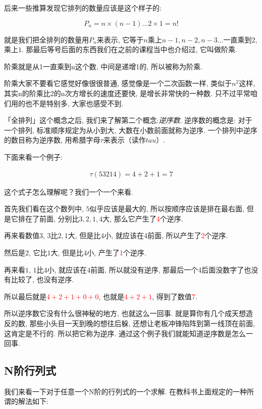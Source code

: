 后来一些推算发现它排列的数量应该是这个样子的: 

\[
  P_n = n \times (n-1) ... 2 \times 1 = n!
\]

就是我们把全排列的数量用$P_n$来表示, 它等于$n$乘上$n-1, n-2, n-3...$一直乘到$2$,乘上$1$. 那最后等号后面的东西我们在之前的课程当中也介绍过, 它叫做阶乘. 

阶乘就是从1一直乘到n这个数, 中间是递增1的, 所以被称为阶乘. 

阶乘大家不要看它感觉好像很很普通, 感觉像是一个二次函数一样, 类似于$n^2$这样, 其实n的阶乘比2的n次方增长的速度还要快, 是增长非常快的一种数. 只不过平常咱们用的也不是特别多, 大家也感受不到. 

「全排列」这个概念之后, 我们来了解第二个概念:\textit{逆序数}. 逆序数的概念是: 对于一个排列, 标准顺序规定为从小到大, 大数在小数前面就称为逆序. 一个排列中逆序的数目称为逆序数, 用希腊字母$\tau$来表示（读作$\mathord{tau}$）. 

下面来看一个例子: 

\begin{align*}
  \tau (53214) = 4+2+1 = 7
\end{align*}

这个式子怎么理解呢？我们一个一个来看. 

首先我们看在这个数列中, $5$似乎应该是最大的, 所以按顺序应该是排在最右面, 但是它排在了前面, 分别比$3,2,1,4$大, 那么它产生了\textcolor{red}{4}个逆序.

再来看数值$3$,  $3$比$2, 1$大, 但是比$4$小, 就应该在$4$前面, 所以产生了\textcolor{red}{2}个逆序.

然后是$2$, 它比$1$大, 但是比$4$小, 产生了\textcolor{red}{1}个逆序. 

再来看$1$,  $1$比$4$小, 就应该在$4$前面, 所以就没有逆序, 那最后一个4后面没数字了也没有比较了, 也没有逆序. 

所以最后就是\textcolor{red}{$4 + 2 + 1 + 0 + 0$}, 也就是\textcolor{red}{$4 + 2 + 1$}, 得到了数值\textcolor{red}{7}. 

所以逆序数它没有什么很神秘的地方, 也就这么一回事. 就是算你有几个成天想造反的数, 那些小头目一天到晚的想往后躲, 还想让老板冲锋陷阵到第一线顶在前面, 这肯定是不行的. 所以把它称为逆序. 通过这个例子我们就能知道逆序数是怎么一回事. 

\subsection{N阶行列式}

我们来看一下对于任意一个N阶的行列式的一个求解. 在教科书上面规定的一种所谓的解法如下: 

